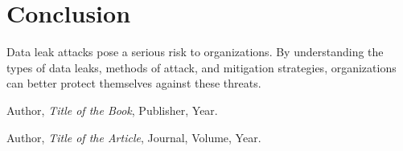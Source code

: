 \documentclass{article}
\begin{document}
\section{Conclusion}
Data leak attacks pose a serious risk to organizations. By understanding the types of data leaks, methods of attack, and mitigation strategies, organizations can better protect themselves against these threats.

\begin{thebibliography}{9}
Author, \emph{Title of the Book}, Publisher, Year.

Author, \emph{Title of the Article}, Journal, Volume, Year.
\end{thebibliography}
\end{document}
